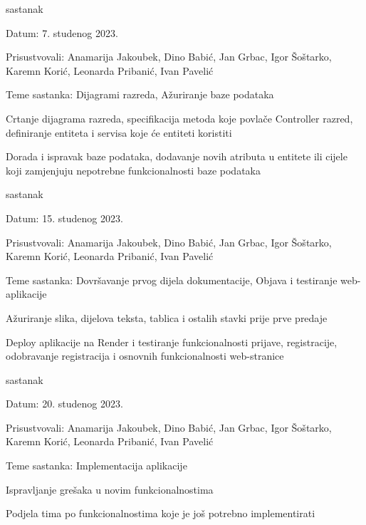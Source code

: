 \begin{packed_enum}
			\item  sastanak
			\item[] \begin{packed_item}
				\item Datum: 7. studenog 2023.
				\item Prisustvovali: Anamarija Jakoubek, Dino Babić, Jan Grbac, Igor Šoštarko, Karemn Korić, Leonarda Pribanić, Ivan Pavelić
				\item Teme sastanka: Dijagrami razreda, Ažuriranje baze podataka
				\begin{packed_item}
					\item Crtanje dijagrama razreda, specifikacija metoda koje povlače Controller razred, definiranje entiteta i servisa koje će entiteti koristiti
					\item Dorada i ispravak baze podataka, dodavanje novih atributa u entitete ili cijele koji zamjenjuju nepotrebne funkcionalnosti baze podataka 
				\end{packed_item}
			\end{packed_item}
			
			\item  sastanak
			\item[] \begin{packed_item}
				\item Datum: 15. studenog 2023.
				\item Prisustvovali: Anamarija Jakoubek, Dino Babić, Jan Grbac, Igor Šoštarko, Karemn Korić, Leonarda Pribanić, Ivan Pavelić
				\item Teme sastanka: Dovršavanje prvog dijela dokumentacije, Objava i testiranje web-aplikacije
				\begin{packed_item}
					\item Ažuriranje slika, dijelova teksta, tablica i ostalih stavki prije prve predaje
					\item Deploy aplikacije na Render i testiranje funkcionalnosti prijave, registracije, odobravanje registracija i osnovnih funkcionalnosti web-stranice
				\end{packed_item}
			\end{packed_item}
			
			\item  sastanak
			\item[] \begin{packed_item}
				\item Datum: 20. studenog 2023.
				\item Prisustvovali: Anamarija Jakoubek, Dino Babić, Jan Grbac, Igor Šoštarko, Karemn Korić, Leonarda Pribanić, Ivan Pavelić
				\item Teme sastanka: Implementacija aplikacije
				\begin{packed_item}
					\item Ispravljanje grešaka u novim funkcionalnostima
					\item Podjela tima po funkcionalnostima koje je još potrebno implementirati
				\end{packed_item}
			\end{packed_item}
			

\end{packed_enum}
